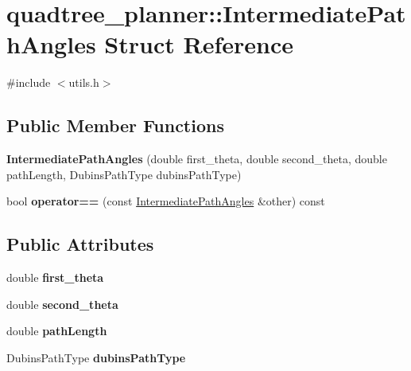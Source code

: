 \hypertarget{structquadtree__planner_1_1IntermediatePathAngles}{}\section{quadtree\+\_\+planner\+:\+:Intermediate\+Path\+Angles Struct Reference}
\label{structquadtree__planner_1_1IntermediatePathAngles}


{\ttfamily \#include $<$utils.\+h$>$}

\subsection*{Public Member Functions}
\begin{DoxyCompactItemize}
\item 
\mbox{\label{structquadtree__planner_1_1IntermediatePathAngles_a711619186b7354288876dc6b125b373d}} 
{\bfseries Intermediate\+Path\+Angles} (double first\+\_\+theta, double second\+\_\+theta, double path\+Length, Dubins\+Path\+Type dubins\+Path\+Type)
\item 
\mbox{\label{structquadtree__planner_1_1IntermediatePathAngles_a20a2e352f73511256a9673875fdb746c}} 
bool {\bfseries operator==} (const \hyperlink{structquadtree__planner_1_1IntermediatePathAngles}{Intermediate\+Path\+Angles} \&other) const
\end{DoxyCompactItemize}
\subsection*{Public Attributes}
\begin{DoxyCompactItemize}
\item 
\mbox{\label{structquadtree__planner_1_1IntermediatePathAngles_aa5247463531a95ae950bbf2a324f136a}} 
double {\bfseries first\+\_\+theta}
\item 
\mbox{\label{structquadtree__planner_1_1IntermediatePathAngles_a6325ee2585820d2122d755c9ae001d76}} 
double {\bfseries second\+\_\+theta}
\item 
\mbox{\label{structquadtree__planner_1_1IntermediatePathAngles_aef18855c07d94b77586c202a924a8c29}} 
double {\bfseries path\+Length}
\item 
\mbox{\label{structquadtree__planner_1_1IntermediatePathAngles_aacc7c846a274efb649a5e03c811f3505}} 
Dubins\+Path\+Type {\bfseries dubins\+Path\+Type}
\end{DoxyCompactItemize}

